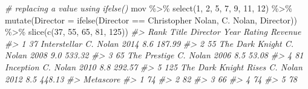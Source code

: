 \documentclass[
]{book}
\newenvironment{Shaded}{\begin{snugshade}}{\end{snugshade}}
\newcommand{\AttributeTok}[1]{\textcolor[rgb]{0.77,0.63,0.00}{#1}}
\newcommand{\CommentTok}[1]{\textcolor[rgb]{0.56,0.35,0.01}{\textit{#1}}}
\newcommand{\DecValTok}[1]{\textcolor[rgb]{0.00,0.00,0.81}{#1}}
\newcommand{\FunctionTok}[1]{\textcolor[rgb]{0.00,0.00,0.00}{#1}}
\newcommand{\NormalTok}[1]{#1}
\newcommand{\SpecialCharTok}[1]{\textcolor[rgb]{0.00,0.00,0.00}{#1}}
\newcommand{\StringTok}[1]{\textcolor[rgb]{0.31,0.60,0.02}{#1}}
\begin{document}
\begin{Shaded}
\begin{Highlighting}[]
\CommentTok{\# replacing a value using ifelse()}
\NormalTok{mov }\SpecialCharTok{\%\textgreater{}\%}
  \FunctionTok{select}\NormalTok{(}\DecValTok{1}\NormalTok{, }\DecValTok{2}\NormalTok{, }\DecValTok{5}\NormalTok{, }\DecValTok{7}\NormalTok{, }\DecValTok{9}\NormalTok{, }\DecValTok{11}\NormalTok{, }\DecValTok{12}\NormalTok{) }\SpecialCharTok{\%\textgreater{}\%}
  \FunctionTok{mutate}\NormalTok{(}\AttributeTok{Director =} \FunctionTok{ifelse}\NormalTok{(Director }\SpecialCharTok{==} \StringTok{\textquotesingle{}Christopher Nolan\textquotesingle{}}\NormalTok{, }\StringTok{\textquotesingle{}C. Nolan\textquotesingle{}}\NormalTok{, Director)) }\SpecialCharTok{\%\textgreater{}\%}
  \FunctionTok{slice}\NormalTok{(}\FunctionTok{c}\NormalTok{(}\DecValTok{37}\NormalTok{, }\DecValTok{55}\NormalTok{, }\DecValTok{65}\NormalTok{, }\DecValTok{81}\NormalTok{, }\DecValTok{125}\NormalTok{))}
\CommentTok{\#\textgreater{}   Rank                 Title Director Year Rating Revenue}
\CommentTok{\#\textgreater{} 1   37          Interstellar C. Nolan 2014    8.6  187.99}
\CommentTok{\#\textgreater{} 2   55       The Dark Knight C. Nolan 2008    9.0  533.32}
\CommentTok{\#\textgreater{} 3   65          The Prestige C. Nolan 2006    8.5   53.08}
\CommentTok{\#\textgreater{} 4   81             Inception C. Nolan 2010    8.8  292.57}
\CommentTok{\#\textgreater{} 5  125 The Dark Knight Rises C. Nolan 2012    8.5  448.13}
\CommentTok{\#\textgreater{}   Metascore}
\CommentTok{\#\textgreater{} 1        74}
\CommentTok{\#\textgreater{} 2        82}
\CommentTok{\#\textgreater{} 3        66}
\CommentTok{\#\textgreater{} 4        74}
\CommentTok{\#\textgreater{} 5        78}


\end{Highlighting}
\end{Shaded}
\end{document}
